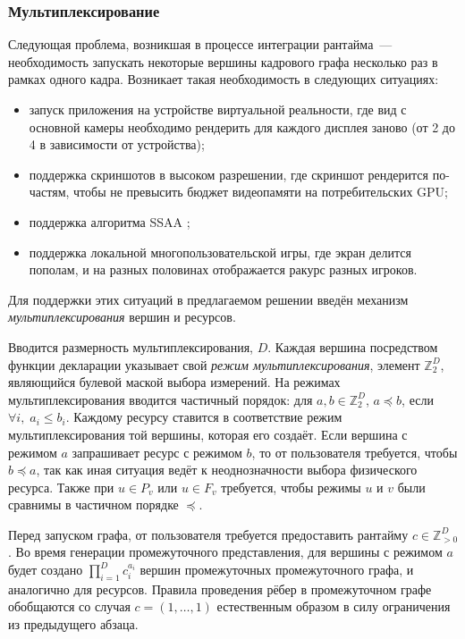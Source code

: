 \subsubsection{Мультиплексирование}
Следующая проблема, возникшая в процессе интеграции рантайма~--- необходимость запускать некоторые вершины кадрового графа несколько раз в рамках одного кадра.
Возникает такая необходимость в следующих ситуациях:
\begin{itemize}
    \item запуск приложения на устройстве виртуальной реальности, где вид с основной камеры необходимо рендерить для каждого дисплея заново (от 2 до 4 в зависимости от устройства);
    \item поддержка скриншотов в высоком разрешении, где скриншот рендерится по-частям, чтобы не превысить бюджет видеопамяти на потребительских GPU;
    \item поддержка алгоритма SSAA ;
    \item поддержка локальной многопользовательской игры, где экран делится пополам, и на разных половинах отображается ракурс разных игроков.
\end{itemize}
Для поддержки этих ситуаций в предлагаемом решении введён механизм \textit{мультиплексирования} вершин и ресурсов.

Вводится размерность мультиплексирования, $D$.
Каждая вершина посредством функции декларации указывает свой \textit{режим мультиплексирования}, элемент $\mathbb{Z}_2^D$, являющийся булевой маской выбора измерений.
На режимах мультиплексирования вводится частичный порядок: для $a,b\in\mathbb{Z}_2^D$, $a \preceq b$, если $\forall i,\;a_i \leqslant b_i$.
Каждому ресурсу ставится в соответствие режим мультиплексирования той вершины, которая его создаёт.
Если вершина с режимом $a$ запрашивает ресурс с режимом $b$, то от пользователя требуется, чтобы $b \preceq a$, так как иная ситуация ведёт к неоднозначности выбора физического ресурса.
Также при $u \in P_v$ или $u \in F_v$ требуется, чтобы режимы $u$ и $v$ были сравнимы в частичном порядке $\preceq$.

Перед запуском графа, от пользователя требуется предоставить рантайму $c \in \mathbb{Z}_{>0}^D$.
Во время генерации промежуточного представления, для вершины с режимом $a$ будет создано $\prod_{i=1}^{D} c_i^{a_i}$ вершин  промежуточных промежуточного графа, и аналогично для ресурсов.
Правила проведения рёбер в промежуточном графе обобщаются со случая $c = \left(1, \dots, 1\right)$ естественным образом в силу ограничения из предыдущего абзаца.

